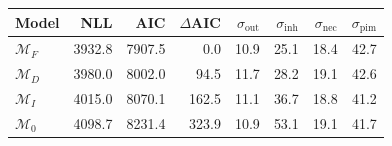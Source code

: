 \begin{tabular}{@{}lrrrrrrr@{}}
\toprule
Model & NLL & AIC & $\Delta$AIC & $\sigma_{\mathrm{out}}$ & $\sigma_{\mathrm{inh}}$ & $\sigma_{\mathrm{nec}}$ & $\sigma_{\mathrm{pim}}$ \\
\midrule
$\mathcal{M}_F$ & 3932.8 & 7907.5 & 0.0 & 10.9 & 25.1 & 18.4 & 42.7 \\
$\mathcal{M}_D$ & 3980.0 & 8002.0 & 94.5 & 11.7 & 28.2 & 19.1 & 42.6 \\
$\mathcal{M}_I$ & 4015.0 & 8070.1 & 162.5 & 11.1 & 36.7 & 18.8 & 41.2 \\
$\mathcal{M}_0$ & 4098.7 & 8231.4 & 323.9 & 10.9 & 53.1 & 19.1 & 41.7 \\
\bottomrule
\end{tabular}